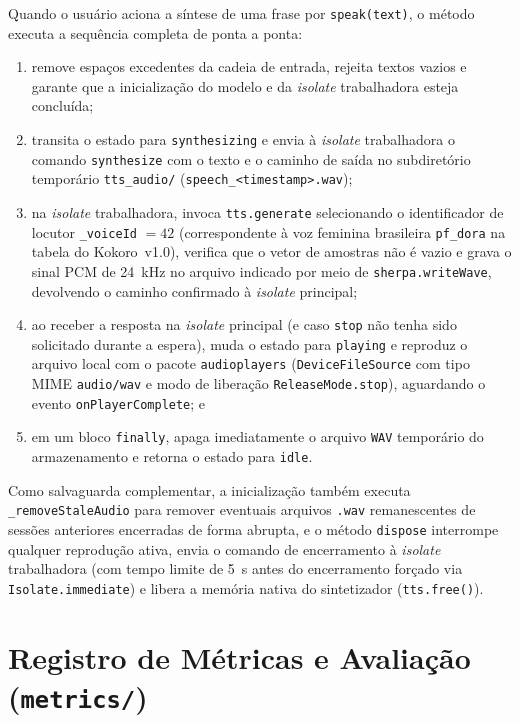Quando o usuário aciona a síntese de uma frase por \texttt{speak(text)}, o método executa a sequência completa de ponta a ponta:
\begin{enumerate}
    \item remove espaços excedentes da cadeia de entrada, rejeita textos vazios e garante que a inicialização do modelo e da \textit{isolate} trabalhadora esteja concluída;
    \item transita o estado para \texttt{synthesizing} e envia à \textit{isolate} trabalhadora o comando \texttt{synthesize} com o texto e o caminho de saída no subdiretório temporário \texttt{tts\_\allowbreak audio/} (\texttt{speech\_\allowbreak <timestamp>.wav});
    \item na \textit{isolate} trabalhadora, invoca \texttt{tts.generate} selecionando o identificador de locutor \texttt{\_voiceId} $= 42$ (correspondente à voz feminina brasileira \texttt{pf\_dora} na tabela do Kokoro~v1.0), verifica que o vetor de amostras não é vazio e grava o sinal PCM de 24~kHz no arquivo indicado por meio de \texttt{sherpa.writeWave}, devolvendo o caminho confirmado à \textit{isolate} principal;
    \item ao receber a resposta na \textit{isolate} principal (e caso \texttt{stop} não tenha sido solicitado durante a espera), muda o estado para \texttt{playing} e reproduz o arquivo local com o pacote \texttt{audioplayers} (\texttt{DeviceFileSource} com tipo MIME \texttt{audio/wav} e modo de liberação \texttt{ReleaseMode.stop}), aguardando o evento \texttt{onPlayerComplete}; e
    \item em um bloco \texttt{finally}, apaga imediatamente o arquivo \texttt{WAV} temporário do armazenamento e retorna o estado para \texttt{idle}.
\end{enumerate}
Como salvaguarda complementar, a inicialização também executa \texttt{\_removeStaleAudio} para remover eventuais arquivos \texttt{.wav} remanescentes de sessões anteriores encerradas de forma abrupta, e o método \texttt{dispose} interrompe qualquer reprodução ativa, envia o comando de encerramento à \textit{isolate} trabalhadora (com tempo limite de 5~s antes do encerramento forçado via \texttt{Isolate.immediate}) e libera a memória nativa do sintetizador (\texttt{tts.free()}).

  \section{Registro de Métricas e Avaliação (\texttt{metrics/})} \label{sec:met_metricas}

